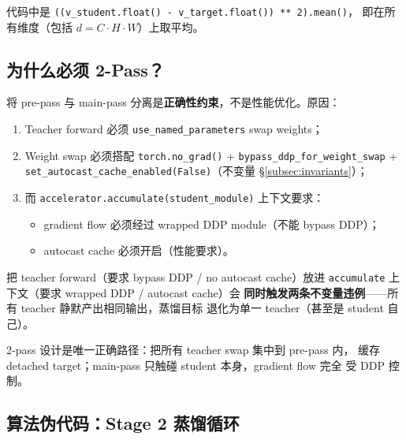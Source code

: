 \documentclass[11pt,a4paper]{article}
\theoremstyle{definition}
\begin{document}
代码中是 \texttt{((v\_student.float() - v\_target.float()) ** 2).mean()}，
即在所有维度（包括 $d = C \cdot H \cdot W$）上取平均。

\subsection{为什么必须 2-Pass？}
\label{subsec:why_two_pass}

将 pre-pass 与 main-pass 分离是\textbf{正确性约束}，不是性能优化。原因：

\begin{enumerate}[leftmargin=1.5em]
\item Teacher forward 必须 \texttt{use\_named\_parameters} swap weights；
\item Weight swap 必须搭配 \texttt{torch.no\_grad()} +
  \texttt{bypass\_ddp\_for\_weight\_swap} +
  \texttt{set\_autocast\_cache\_enabled(False)}（不变量
  \S\ref{subsec:invariants}）；
\item 而 \texttt{accelerator.accumulate(student\_module)} 上下文要求：
  \begin{itemize}[leftmargin=1em]
    \item gradient flow 必须经过 wrapped DDP module（不能 bypass DDP）；
    \item autocast cache 必须开启（性能要求）。
  \end{itemize}
\end{enumerate}

把 teacher forward（要求 bypass DDP / no autocast cache）放进
\texttt{accumulate} 上下文（要求 wrapped DDP / autocast cache）会
\textbf{同时触发两条不变量违例}——所有 teacher 静默产出相同输出，蒸馏目标
退化为单一 teacher（甚至是 student 自己）。

2-pass 设计是唯一正确路径：把所有 teacher swap 集中到 pre-pass 内，
缓存 detached target；main-pass 只触碰 student 本身，gradient flow 完全
受 DDP 控制。

\subsection{算法伪代码：Stage 2 蒸馏循环}
\end{document}
